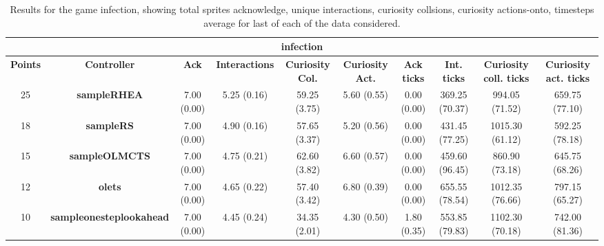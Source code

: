\begin{table*}[!t]
\begin{center}
\begin{adjustbox}{width=1\textwidth}
\begin{tabular}{|c|c|c|c|c|c|c|c|c|c|}
\multicolumn{10}{c}{\textbf{infection}}\\
\hline
\textbf{Points} & \textbf{Controller} & \textbf{Ack} & \textbf{Interactions} & \textbf{Curiosity Col.} & \textbf{Curiosity Act.} & \textbf{Ack ticks} & \textbf{Int. ticks} & \textbf{Curiosity coll. ticks} & \textbf{Curiosity act. ticks}\\
\hline
25 & \textbf{sampleRHEA} & 7.00 (0.00) & 5.25 (0.16) & 59.25 (3.75) & 5.60 (0.55) & 0.00 (0.00) & 369.25 (70.37) & 994.05 (71.52) & 659.75 (77.10)
 \\
\hline
18 & \textbf{sampleRS} & 7.00 (0.00) & 4.90 (0.16) & 57.65 (3.37) & 5.20 (0.56) & 0.00 (0.00) & 431.45 (77.25) & 1015.30 (61.12) & 592.25 (78.18)
 \\
\hline
15 & \textbf{sampleOLMCTS} & 7.00 (0.00) & 4.75 (0.21) & 62.60 (3.82) & 6.60 (0.57) & 0.00 (0.00) & 459.60 (96.45) & 860.90 (73.18) & 645.75 (68.26)
 \\
\hline
12 & \textbf{olets} & 7.00 (0.00) & 4.65 (0.22) & 57.40 (3.42) & 6.80 (0.39) & 0.00 (0.00) & 655.55 (78.54) & 1012.35 (76.66) & 797.15 (65.27)
 \\
\hline
10 & \textbf{sampleonesteplookahead} & 7.00 (0.00) & 4.45 (0.24) & 34.35 (2.01) & 4.30 (0.50) & 1.80 (0.35) & 553.85 (79.83) & 1102.30 (70.18) & 742.00 (81.36)
 \\
\hline
\end{tabular}
\end{adjustbox}
\caption{Results for the game infection, showing total sprites acknowledge, unique interactions, curiosity collsions, curiosity actions-onto, timesteps average for last of each of the data considered.}
\label{tab:weights}
\end{center}
\end{table*}
